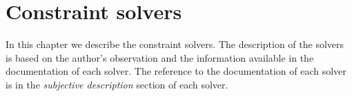\chapter{Constraint solvers}
\label{constraint-solvers}

In this chapter we describe the constraint solvers. The description of the solvers is
based on the author's observation and the information available in the documentation
of each solver. The reference to the documentation of each solver is in the
{\em subjective description} section of each solver.














